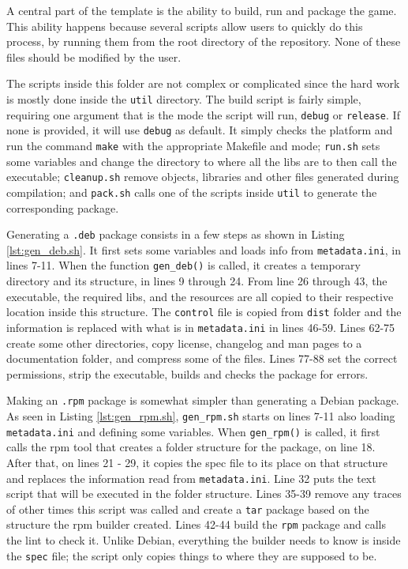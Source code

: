 A central part of the template is the ability to build, run and package the game. This ability happens because several scripts allow users to quickly do this process, by running them from the root directory of the repository. None of these files should be modified by the user.

The scripts inside this folder are not complex or complicated since the hard work is mostly done inside the \texttt{util} directory. The build script is fairly simple, requiring one argument that is the mode the script will run, \texttt{debug} or \texttt{release}. If none is provided, it will use \texttt{debug} as default. It simply checks the platform and run the command \texttt{make} with the appropriate Makefile and mode; \texttt{run.sh} sets some variables and change the directory to where all the libs are to then call the executable; \texttt{cleanup.sh} remove objects, libraries and other files generated during compilation; and \texttt{pack.sh} calls one of the scripts inside \texttt{util} to generate the corresponding package.

Generating a \texttt{.deb} package consists in a few steps as shown in Listing \ref{lst:gen_deb.sh}. It first sets some variables and loads info from \texttt{metadata.ini}, in lines 7-11. When the function \texttt{gen\_deb()} is called, it creates a temporary directory and its structure, in lines 9 through 24. From line 26 through 43, the executable, the required libs, and the resources are all copied to their respective location inside this structure. The \texttt{control} file is copied from \texttt{dist} folder and the information is replaced with what is in \texttt{metadata.ini} in lines 46-59. Lines 62-75 create some other directories, copy license, changelog and man pages to a documentation folder, and compress some of the files. Lines 77-88 set the correct permissions, strip the executable, builds and checks the package for errors.



Making an \texttt{.rpm} package is somewhat simpler than generating a Debian package. As seen in Listing \ref{lst:gen_rpm.sh}, \texttt{gen\_rpm.sh} starts on lines 7-11 also loading \texttt{metadata.ini} and defining some variables. When \texttt{gen\_rpm()} is called, it first calls the rpm tool that creates a folder structure for the package, on line 18. After that, on lines 21 - 29, it copies the spec file to its place on that structure and replaces the information read from \texttt{metadata.ini}. Line 32 puts the text script that will be executed in the folder structure. Lines 35-39 remove any traces of other times this script was called and create a \texttt{tar} package based on the structure the rpm builder created. Lines 42-44 build the \texttt{rpm} package and calls the lint to check it. Unlike Debian, everything the builder needs to know is inside the \texttt{spec} file; the script only copies things to where they are supposed to be.


